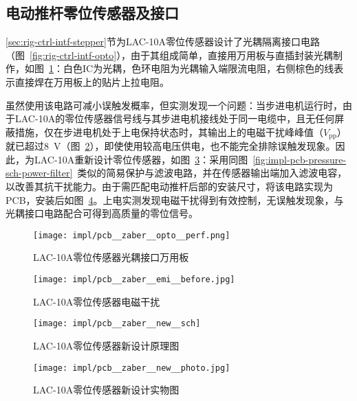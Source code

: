 

\subsection{电动推杆零位传感器及接口}\label{sec:impl-pcb-zaber}

\ref{sec:rig-ctrl-intf-stepper}节为LAC-10A零位传感器设计了光耦隔离接口电路（图~\ref{fig:rig-ctrl-intf-opto}），由于其组成简单，直接用万用板与直插封装光耦制作，如图~\ref{fig:impl-pcb-zaber-opto-perf}：白色IC为光耦，色环电阻为光耦输入端限流电阻，右侧棕色的线表示直接焊在万用板上的贴片上拉电阻。

虽然使用该电路可减小误触发概率，但实测发现一个问题：当步进电机运行时，由于LAC-10A的零位传感器信号线与其步进电机接线处于同一电缆中，且无任何屏蔽措施，仅在步进电机处于上电保持状态时，其输出上的电磁干扰峰峰值（$V_{\mathrm{pp}}$）就已超过\SI{8}{\V}（图~\ref{fig:impl-pcb-zaber-emi-before}），即使使用较高电压供电，也不能完全排除误触发现象。因此，为LAC-10A重新设计零位传感器，如图~\ref{fig:impl-pcb-zaber-new-sch}：采用同图~\ref{fig:impl-pcb-pressure-sch-power-filter}~类似的简易保护与滤波电路，并在传感器输出端加入滤波电容，以改善其抗干扰能力。由于需匹配电动推杆后部的安装尺寸，将该电路实现为PCB，安装后如图~\ref{fig:impl-pcb-zaber-new-photo}。上电实测发现电磁干扰得到有效控制，无误触发现象，与光耦接口电路配合可得到高质量的零位信号。

\begin{figure}[tbhp]
\centering
\texttt{[image: impl/pcb\_\_zaber\_\_opto\_\_perf.png]}
\caption{LAC-10A零位传感器\csep 光耦接口\csep 万用板}
\label{fig:impl-pcb-zaber-opto-perf}
\end{figure}

\begin{figure}[tbhp]
\centering
\texttt{[image: impl/pcb\_\_zaber\_\_emi\_\_before.jpg]}
\caption{LAC-10A零位传感器\csep 电磁干扰}
\label{fig:impl-pcb-zaber-emi-before}
\end{figure}

\begin{figure}[p]
\centering
\texttt{[image: impl/pcb\_\_zaber\_\_new\_\_sch]}
\caption{LAC-10A零位传感器\csep 新设计\csep 原理图}
\label{fig:impl-pcb-zaber-new-sch}
\end{figure}

\begin{figure}[p]
\centering
\texttt{[image: impl/pcb\_\_zaber\_\_new\_\_photo.jpg]}
\caption{LAC-10A零位传感器\csep 新设计\csep 实物图}
\label{fig:impl-pcb-zaber-new-photo}
\end{figure}


